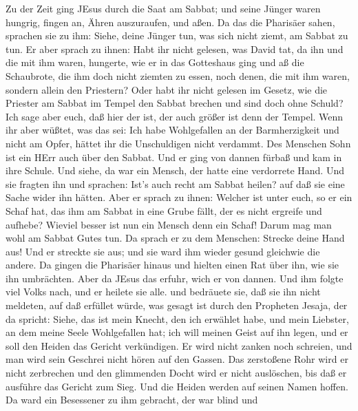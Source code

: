  Zu der Zeit ging JEsus durch die Saat am Sabbat; und seine
Jünger waren hungrig, fingen an, Ähren auszuraufen, und aßen.
 Da das die Pharisäer sahen, sprachen sie zu ihm: Siehe,
deine Jünger tun, was sich nicht ziemt, am Sabbat zu tun. 
Er aber sprach zu ihnen: Habt ihr nicht gelesen, was David tat, da ihn
und die mit ihm waren, hungerte,  wie er in das Gotteshaus
ging und aß die Schaubrote, die ihm doch nicht ziemten zu essen, noch
denen, die mit ihm waren, sondern allein den Priestern? 
Oder habt ihr nicht gelesen im Gesetz, wie die Priester am Sabbat im
Tempel den Sabbat brechen und sind doch ohne Schuld?  Ich
sage aber euch, daß hier der ist, der auch größer ist denn der Tempel.
 Wenn ihr aber wüßtet, was das sei: Ich habe Wohlgefallen an
der Barmherzigkeit und nicht am Opfer, hättet ihr die Unschuldigen nicht
verdammt.  Des Menschen Sohn ist ein HErr auch über den
Sabbat.  Und er ging von dannen fürbaß und kam in ihre
Schule.  Und siehe, da war ein Mensch, der hatte eine
verdorrete Hand. Und sie fragten ihn und sprachen: Ist's auch recht am
Sabbat heilen? auf daß sie eine Sache wider ihn hätten. 
Aber er sprach zu ihnen: Welcher ist unter euch, so er ein Schaf hat,
das ihm am Sabbat in eine Grube fällt, der es nicht ergreife und
aufhebe?  Wieviel besser ist nun ein Mensch denn ein Schaf!
Darum mag man wohl am Sabbat Gutes tun.  Da sprach er zu
dem Menschen: Strecke deine Hand aus! Und er streckte sie aus; und sie
ward ihm wieder gesund gleichwie die andere.  Da gingen die
Pharisäer hinaus und hielten einen Rat über ihn, wie sie ihn umbrächten.
 Aber da JEsus das erfuhr, wich er von dannen. Und ihm
folgte viel Volks nach, und er heilete sie alle.  und
bedräuete sie, daß sie ihn nicht meldeten,  auf daß
erfüllet würde, was gesagt ist durch den Propheten Jesaja, der da
spricht:  Siehe, das ist mein Knecht, den ich erwählet
habe, und mein Liebster, an dem meine Seele Wohlgefallen hat; ich will
meinen Geist auf ihn legen, und er soll den Heiden das Gericht
verkündigen.  Er wird nicht zanken noch schreien, und man
wird sein Geschrei nicht hören auf den Gassen.  Das
zerstoßene Rohr wird er nicht zerbrechen und den glimmenden Docht wird
er nicht auslöschen, bis daß er ausführe das Gericht zum Sieg.
 Und die Heiden werden auf seinen Namen hoffen.
 Da ward ein Besessener zu ihm gebracht, der war blind und

